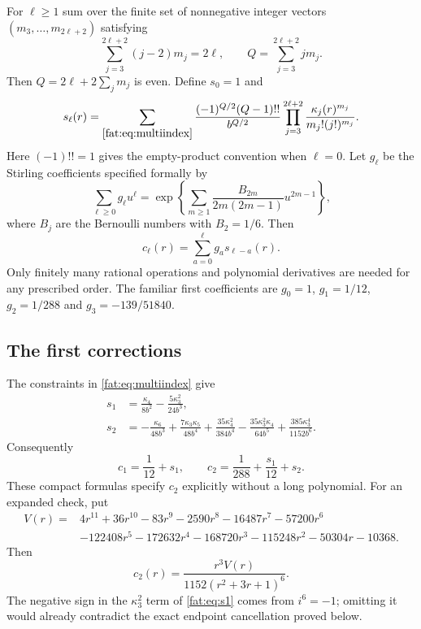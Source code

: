\documentclass[11pt,letterpaper]{article}
\numberwithin{equation}{section}
\theoremstyle{remark}\newtheorem{remark}[theorem]{Remark}
\begin{document}
For $\ell\ge1$ sum over the finite set of nonnegative integer vectors $(m_3,\ldots,m_{2\ell+2})$ satisfying
\begin{equation}\label{fat:eq:multiindex}
 \sum_{j=3}^{2\ell+2}(j-2)m_j=2\ell,
 \qquad Q=\sum_{j=3}^{2\ell+2}jm_j.
\end{equation}
Then $Q=2\ell+2\sum_jm_j$ is even. Define $s_0=1$ and
\begin{equation}\label{fat:eq:sell}
 s_\ell(r)=\sum_{\eqref{fat:eq:multiindex}}
 \frac{(-1)^{Q/2}(Q-1)!!}{b^{Q/2}}
 \prod_{j=3}^{2\ell+2}
 \frac{\kappa_j(r)^{m_j}}{m_j!(j!)^{m_j}}.
\end{equation}
Here $(-1)!!=1$ gives the empty-product convention when $\ell=0$.
Let $g_\ell$ be the Stirling coefficients specified formally by
\begin{equation}\label{fat:eq:stirling}
 \sum_{\ell\ge0}g_\ell u^\ell
 =\exp\left\{\sum_{m\ge1}\frac{B_{2m}}{2m(2m-1)}u^{2m-1}\right\},
\end{equation}
where $B_j$ are the Bernoulli numbers with $B_2=1/6$. Then
\begin{equation}\label{fat:eq:convolution}
 c_\ell(r)=\sum_{a=0}^\ell g_a s_{\ell-a}(r).
\end{equation}
Only finitely many rational operations and polynomial derivatives are needed for any prescribed order. The familiar first coefficients are $g_0=1$, $g_1=1/12$, $g_2=1/288$ and $g_3=-139/51840$.

\subsection{The first corrections}
The constraints in \eqref{fat:eq:multiindex} give
\begin{align}
 s_1&=\frac{\kappa_4}{8b^2}-\frac{5\kappa_3^2}{24b^3},\label{fat:eq:s1}\\
 s_2&=-\frac{\kappa_6}{48b^3}+\frac{7\kappa_3\kappa_5}{48b^4}
 +\frac{35\kappa_4^2}{384b^4}
 -\frac{35\kappa_3^2\kappa_4}{64b^5}
 +\frac{385\kappa_3^4}{1152b^6}.\label{fat:eq:s2}
\end{align}
Consequently
\begin{equation}\label{fat:eq:firsttwo}
 c_1=\frac1{12}+s_1,\qquad
 c_2=\frac1{288}+\frac{s_1}{12}+s_2.
\end{equation}
These compact formulas specify $c_2$ explicitly without a long polynomial. For an expanded check, put
\begin{align*}
 V(r)={}&4r^{11}+36r^{10}-83r^9-2590r^8-16487r^7-57200r^6\\
 &-122408r^5-172632r^4-168720r^3-115248r^2-50304r-10368.
\end{align*}
Then
\begin{equation}\label{fat:eq:c2expanded}
 c_2(r)=\frac{r^3V(r)}{1152(r^2+3r+1)^6}.
\end{equation}
The negative sign in the $\kappa_3^2$ term of \eqref{fat:eq:s1} comes from $i^6=-1$; omitting it would already contradict the exact endpoint cancellation proved below.
\end{document}
